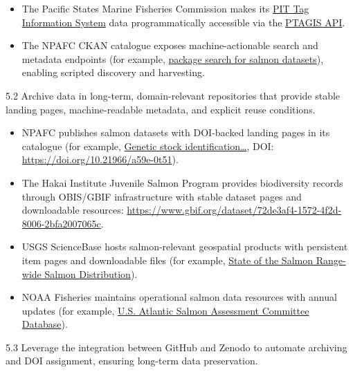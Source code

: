 \documentclass[
  letterpaper,
  DIV=11,
  numbers=noendperiod]{scrartcl}
\providecommand{\tightlist}{%
  \setlength{\itemsep}{0pt}\setlength{\parskip}{0pt}}
\begin{document}
\begin{itemize}
\tightlist
\item
  The Pacific States Marine Fisheries Commission makes its
  \href{https://www.psmfc.org/program/pit-tag-information-systems-ptagis}{PIT
  Tag Information System} data programmatically accessible via the
  \href{https://api.ptagis.org/index.html}{PTAGIS API}.
\item
  The NPAFC CKAN catalogue exposes machine-actionable search and
  metadata endpoints (for example,
  \href{https://data.npafc.org/api/3/action/package_search?q=salmon}{package
  search for salmon datasets}), enabling scripted discovery and
  harvesting.
\end{itemize}

5.2 Archive data in long-term, domain-relevant repositories that provide
stable landing pages, machine-readable metadata, and explicit reuse
conditions.

\begin{itemize}
\tightlist
\item
  NPAFC publishes salmon datasets with DOI-backed landing pages in its
  catalogue (for example,
  \href{https://data.npafc.org/dataset/ca-cioos_2dac6609-3541-458c-88b1-5564599d9621?local=en}{Genetic
  stock identification\ldots{}}, DOI:
  \url{https://doi.org/10.21966/a59e-0t51}).
\item
  The Hakai Institute Juvenile Salmon Program provides biodiversity
  records through OBIS/GBIF infrastructure with stable dataset pages and
  downloadable resources:
  \url{https://www.gbif.org/dataset/72de3af4-1572-4f2d-8006-2bfa2007065c}.
\item
  USGS ScienceBase hosts salmon-relevant geospatial products with
  persistent item pages and downloadable files (for example,
  \href{https://www.sciencebase.gov/catalog/item/50dfaef8e4b0dfbe79e6e88a}{State
  of the Salmon Range-wide Salmon Distribution}).
\item
  NOAA Fisheries maintains operational salmon data resources with annual
  updates (for example,
  \href{https://www.fisheries.noaa.gov/resource/data/us-atlantic-salmon-assessment-committee-database}{U.S.
  Atlantic Salmon Assessment Committee Database}).
\end{itemize}

5.3 Leverage the integration between GitHub and Zenodo to automate
archiving and DOI assignment, ensuring long-term data preservation.
\end{document}
